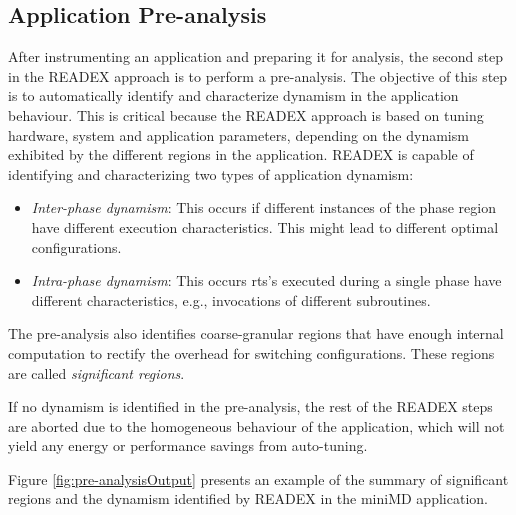 \subsection{Application Pre-analysis}
\label{sec:dynamism_detection}
After instrumenting an application and preparing it for analysis, the second step in the READEX approach is to perform a pre-analysis. The objective of this step is to automatically identify and characterize dynamism in the application behaviour. This is critical because the READEX approach is based on tuning hardware, system and application parameters, depending on the dynamism exhibited by the different regions in the application. READEX is capable of identifying and characterizing two types of application dynamism:
\begin{itemize}
  \item \textit{Inter-phase dynamism}: This occurs if different instances of the phase region have different execution characteristics. This might lead to different optimal configurations.
  \item \textit{Intra-phase dynamism}: This occurs rts's executed during a single phase have different characteristics, e.g., invocations of different subroutines.
\end{itemize}

The pre-analysis also identifies coarse-granular regions that have enough internal computation to rectify the overhead for switching configurations. These regions are called \textit{significant regions}. 

If no dynamism is identified in the pre-analysis, the rest of the READEX steps are aborted due to the homogeneous behaviour of the application, which will not yield any energy or performance savings from auto-tuning.

Figure \ref{fig:pre-analysisOutput} presents an example of the summary of significant regions and the dynamism identified by READEX in the miniMD application.



